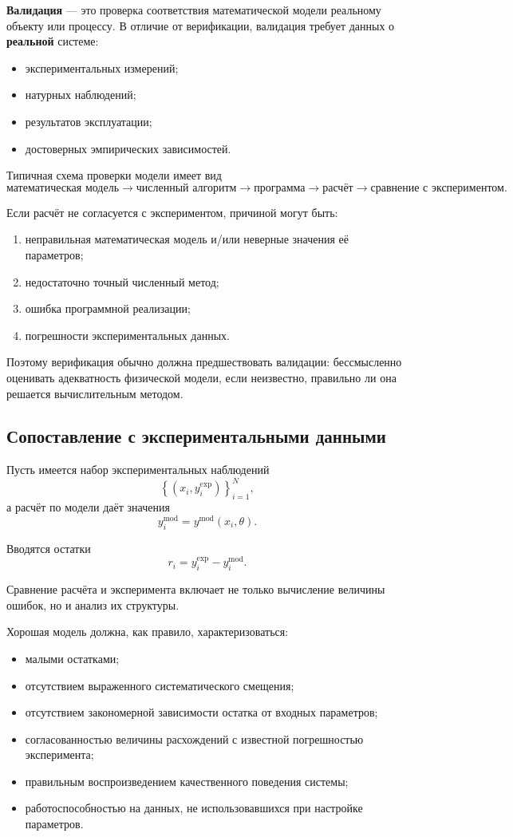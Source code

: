 \textbf{Валидация} --- это проверка соответствия математической модели реальному объекту или процессу. В отличие от верификации, валидация требует данных о \textbf{реальной} системе:
\begin{itemize}
	\item экспериментальных измерений;
	\item натурных наблюдений;
	\item результатов эксплуатации;
	\item достоверных эмпирических зависимостей.
\end{itemize}

Типичная схема проверки модели имеет вид
\[
\text{математическая модель}
\longrightarrow
\text{численный алгоритм}
\longrightarrow
\text{программа}
\longrightarrow
\text{расчёт}
\longrightarrow
\text{сравнение с экспериментом}.
\]

Если расчёт не согласуется с экспериментом, причиной могут быть:
\begin{enumerate}
	\item неправильная математическая модель и/или неверные значения её параметров;
	\item недостаточно точный численный метод;
	\item ошибка программной реализации;
	\item погрешности экспериментальных данных.
\end{enumerate}

Поэтому верификация обычно должна предшествовать валидации: бессмысленно оценивать адекватность физической модели, если неизвестно, правильно ли она решается вычислительным методом.

\subsection{Сопоставление с экспериментальными данными}

Пусть имеется набор экспериментальных наблюдений
\[
\left\{(x_i,y_i^{\mathrm{exp}})\right\}_{i=1}^{N},
\]
а расчёт по модели даёт значения
\[
y_i^{\mathrm{mod}}=y^{\mathrm{mod}}(x_i,\theta).
\]

Вводятся остатки
\[
r_i=y_i^{\mathrm{exp}}-y_i^{\mathrm{mod}}.
\]

Сравнение расчёта и эксперимента включает не только вычисление величины ошибок, но и анализ их структуры.

Хорошая модель должна, как правило, характеризоваться:
\begin{itemize}
	\item малыми остатками;
	\item отсутствием выраженного систематического смещения;
	\item отсутствием закономерной зависимости остатка от входных параметров;
	\item согласованностью величины расхождений с известной погрешностью эксперимента;
	\item правильным воспроизведением качественного поведения системы;
	\item работоспособностью на данных, не использовавшихся при настройке параметров.
\end{itemize}

